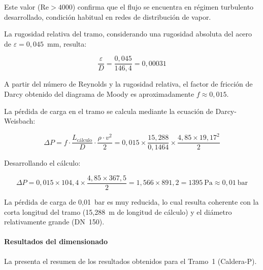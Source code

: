 Este valor ($\text{Re} > 4000$) confirma que el flujo se encuentra en régimen turbulento desarrollado, condición habitual en redes de distribución de vapor.

La rugosidad relativa del tramo, considerando una rugosidad absoluta del acero de $\varepsilon = 0{,}045$~mm, resulta:

\begin{equation}
	\frac{\varepsilon}{D} = \frac{0{,}045}{146{,}4} = 0{,}00031
	\label{eq:rugosidad-relativa-tramo1}
\end{equation}

A partir del número de Reynolds y la rugosidad relativa, el factor de fricción de Darcy obtenido del diagrama de Moody es aproximadamente $f \approx 0{,}015$.

La pérdida de carga en el tramo se calcula mediante la ecuación de Darcy-Weisbach:

\begin{equation}
	\Delta P = f \cdot \frac{L_{\text{cálculo}}}{D} \cdot \frac{\rho \cdot v^2}{2} = 0{,}015 \times \frac{15{,}288}{0{,}1464} \times \frac{4{,}85 \times 19{,}17^2}{2}
	\label{eq:darcy-tramo1}
\end{equation}

Desarrollando el cálculo:

\begin{equation}
	\Delta P = 0{,}015 \times 104{,}4 \times \frac{4{,}85 \times 367{,}5}{2} = 1{,}566 \times 891{,}2 = 1395 \ \text{Pa} \approx 0{,}01 \ \text{bar}
	\label{eq:perdida-carga-tramo1}
\end{equation}

La pérdida de carga de 0,01~bar es muy reducida, lo cual resulta coherente con la corta longitud del tramo (15,288~m de longitud de cálculo) y el diámetro relativamente grande (DN~150).

\paragraph{Resultados del dimensionado}

La  presenta el resumen de los resultados obtenidos para el Tramo~1 (Caldera-P).

